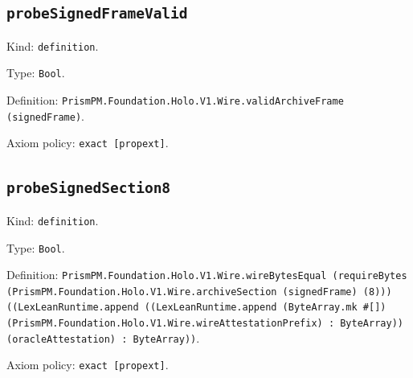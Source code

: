 \documentclass[11pt]{article}
\begin{document}
\subsection*{\texttt{probeSignedFrameValid}}
\noindent Kind: \texttt{definition}.\par
\noindent Type: \texttt{Bool}.\par
\noindent Definition: \texttt{PrismPM.Foundation.Holo.V1.Wire.validArchiveFrame (signedFrame)}.\par
\noindent Axiom policy: \texttt{exact [propext]}.\par
\subsection*{\texttt{probeSignedSection8}}
\noindent Kind: \texttt{definition}.\par
\noindent Type: \texttt{Bool}.\par
\noindent Definition: \texttt{PrismPM.Foundation.Holo.V1.Wire.wireBytesEqual (requireBytes (PrismPM.Foundation.Holo.V1.Wire.archiveSection (signedFrame) (8))) ((LexLeanRuntime.append ((LexLeanRuntime.append (ByteArray.mk \#[]) (PrismPM.Foundation.Holo.V1.Wire.wireAttestationPrefix) : ByteArray)) (oracleAttestation) : ByteArray))}.\par
\noindent Axiom policy: \texttt{exact [propext]}.\par
\end{document}

